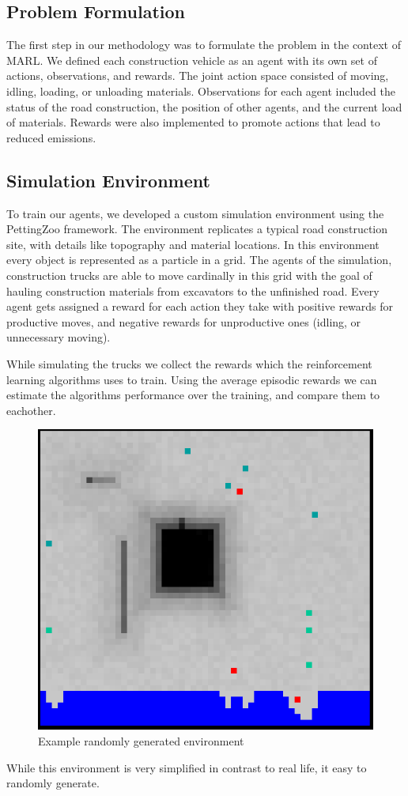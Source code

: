 \documentclass[conference]{IEEEtran}
\begin{document}
	\subsection{Problem Formulation}
	The first step in our methodology was to formulate the problem in the context of MARL. We defined each construction vehicle as an agent with its own set of actions, observations, and rewards. The joint action space consisted of moving, idling, loading, or unloading materials. Observations for each agent included the status of the road construction, the position of other agents, and the current load of materials. Rewards were also implemented to promote actions that lead to reduced emissions.

	\subsection{Simulation Environment}
	To train our agents, we developed a custom simulation environment using the PettingZoo framework. The environment replicates a typical road construction site, with details like topography and material locations. In this environment every object is represented as a particle in a grid.
	The agents of the simulation, construction trucks are able to move cardinally in this grid with the goal of hauling construction materials from excavators to the unfinished road.
	Every agent gets assigned a reward for each action they take with positive rewards for productive moves, and negative rewards for unproductive ones (idling, or unnecessary moving).

	While simulating the trucks we collect the rewards which the reinforcement learning algorithms uses to train.
	Using the average episodic rewards we can estimate the algorithms performance over the training, and compare them to eachother.
	\begin{figure}
		\includegraphics[width=0.9\columnwidth]{graphs/example_env.png}
		\caption{Example randomly generated environment}
	\end{figure}
	While this environment is very simplified in contrast to real life, it easy to randomly generate.
\end{document}
